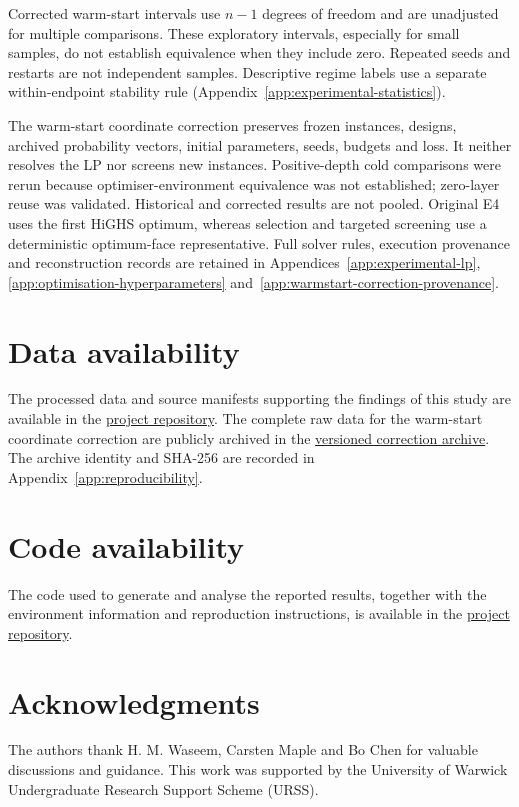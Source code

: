 \documentclass[a4paper,onecolumn,11pt,unpublished]{quantumarticle}
\theoremstyle{remark}
\begin{document}
Corrected warm-start intervals use $n-1$ degrees of freedom and are
unadjusted for multiple comparisons. These exploratory intervals, especially
for small samples, do not establish equivalence when they include zero.
Repeated seeds and restarts are not independent samples. Descriptive regime
labels use a separate within-endpoint stability rule
(Appendix~\ref{app:experimental-statistics}).

The warm-start coordinate correction preserves frozen instances, designs,
archived probability vectors, initial parameters, seeds, budgets and loss.
It neither resolves the LP nor screens new instances. Positive-depth cold
comparisons were rerun because optimiser-environment equivalence was not
established; zero-layer reuse was validated. Historical and corrected results
are not pooled. Original E4 uses the first HiGHS optimum, whereas selection
and targeted screening use a deterministic optimum-face representative.
Full solver rules, execution provenance and reconstruction records are
retained in Appendices~\ref{app:experimental-lp},
\ref{app:optimisation-hyperparameters}
and~\ref{app:warmstart-correction-provenance}.

\FloatBarrier
\section*{Data availability}
The processed data and source manifests supporting the findings of this study
are available in the
\href{https://github.com/rrocy6/urss-selective-locality-reduction}{project
repository}. The complete raw data for the warm-start coordinate correction are publicly
archived in the
\href{https://github.com/rrocy6/urss-selective-locality-reduction/blob/efaa1ce60fbc9984006472c4b2672578027fac78/delivery/20260913/archives/URSS_WARMSTART_CORRECTION_EXECUTED_v1.zip}{versioned correction archive}.
The archive identity and SHA-256 are recorded in
Appendix~\ref{app:reproducibility}. 

\section*{Code availability}
The code used to generate and analyse the reported results, together with the
environment information and reproduction instructions, is available in the
\href{https://github.com/rrocy6/urss-selective-locality-reduction}{project
repository}.

\section*{Acknowledgments}
The authors thank H. M. Waseem, Carsten Maple and Bo Chen for valuable discussions and guidance. This work was supported by the University of Warwick Undergraduate Research Support Scheme (URSS).
\end{document}
